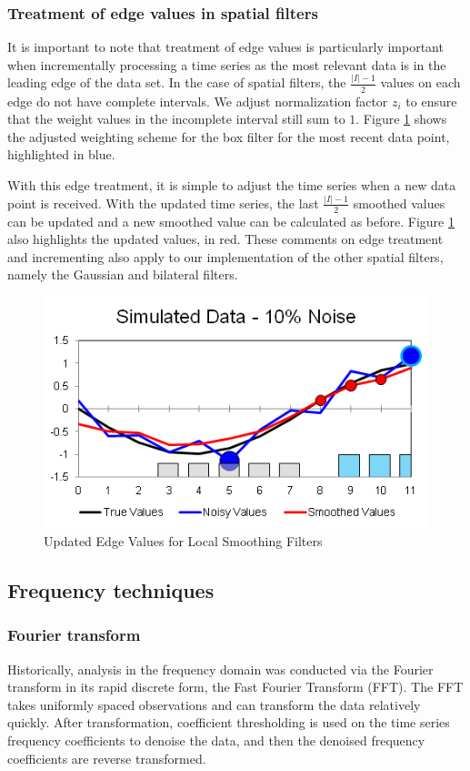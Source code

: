 \documentclass[11pt]{article}
\theoremstyle{definition}
\begin{document}
\FloatBarrier


\subsubsection{Treatment of edge values in spatial filters} 

It is important to note that treatment of edge values is particularly
important when incrementally processing a time series as the most
relevant data is in the leading edge of the data set. In the case of
spatial filters, the $\frac{\lvert I \rvert - 1}{2}$ values on each
edge do not have complete intervals. We adjust normalization factor
$z_i$ to ensure that the weight values in the incomplete interval
still sum to $1$. Figure \ref{increment} shows the adjusted weighting
scheme for the box filter for the most recent data point, highlighted
in blue.

With this edge treatment, it is simple to adjust the time series when
a new data point is received. With the updated time series, the last
$\frac{\lvert I \rvert - 1}{2}$ smoothed values can be updated and a
new smoothed value can be calculated as before. Figure \ref{increment}
also highlights the updated values, in red. These comments on edge
treatment and incrementing also apply to our implementation of the
other spatial filters, namely the Gaussian and bilateral filters.

\begin{figure}[h!]
\centering
\includegraphics[width = 0.4 \textwidth]{Increment.png}
\caption{Updated Edge Values for Local Smoothing Filters}
\label{increment}
\end{figure}



\subsection{Frequency techniques}
\subsubsection{Fourier transform} 
Historically, analysis in the frequency domain was conducted via the
Fourier transform in its rapid discrete form, the Fast Fourier
Transform (FFT). The FFT takes uniformly spaced observations and can
transform the data relatively quickly. After transformation,
coefficient thresholding is used on the time series frequency
coefficients to denoise the data, and then the denoised frequency
coefficients are reverse transformed.
\end{document}
